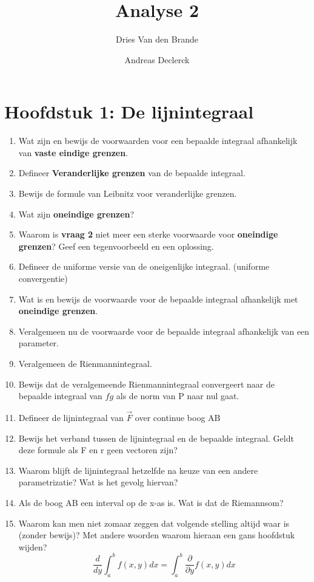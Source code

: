 \documentclass[12pt]{article}
\begin{document}
    \title{Analyse 2}
    \author{Dries Van den Brande \and Andreas Declerck}

    \maketitle
    \section*{Hoofdstuk 1: De lijnintegraal}
    \begin{enumerate}
        \item Wat zijn en bewijs de voorwaarden voor een bepaalde integraal afhankelijk van \textbf{vaste eindige grenzen}.
        \item Defineer \textbf{Veranderlijke grenzen} van de bepaalde integraal.
        \item Bewijs de formule van Leibnitz voor veranderlijke grenzen.
        \item Wat zijn \textbf{oneindige grenzen}?
        \item Waarom is \textbf{vraag 2} niet meer een sterke voorwaarde voor \textbf{oneindige grenzen}? Geef een tegenvoorbeeld en een oplossing.
        \item Defineer de uniforme versie van de oneigenlijke integraal. (uniforme convergentie)
        \item Wat is en bewijs de voorwaarde voor de bepaalde integraal afhankelijk met \textbf{oneindige grenzen}.
        \item Veralgemeen nu de voorwaarde voor de bepaalde integraal afhankelijk van een parameter.
        \item Veralgemeen de Rienmannintegraal.
        \item Bewijs dat de veralgemeende Rienmannintegraal convergeert naar de bepaalde integraal van $fg$ als de norm van P naar nul gaat.
        \item Defineer de lijnintegraal van $\vec{F}$ over continue boog AB
        \item Bewijs het verband tussen de lijnintegraal en de bepaalde integraal. Geldt deze formule als F en r geen vectoren zijn?
        \item Waarom blijft de lijnintegraal hetzelfde na keuze van een andere parametrizatie? Wat is het gevolg hiervan?
        \item Als de boog AB een interval op de x-as is. Wat is dat de Riemannsom?
        \item Waarom kan men niet zomaar zeggen dat volgende stelling altijd waar is (zonder bewijs)? Met andere woorden waarom hieraan een gans hoofdstuk wijden?
            $$ \frac{d}{dy}\int_a^b f(x,y)dx = \int_a^b \frac{\partial}{\partial y}f(x, y)dx $$
    \end{enumerate}    
\end{document}
